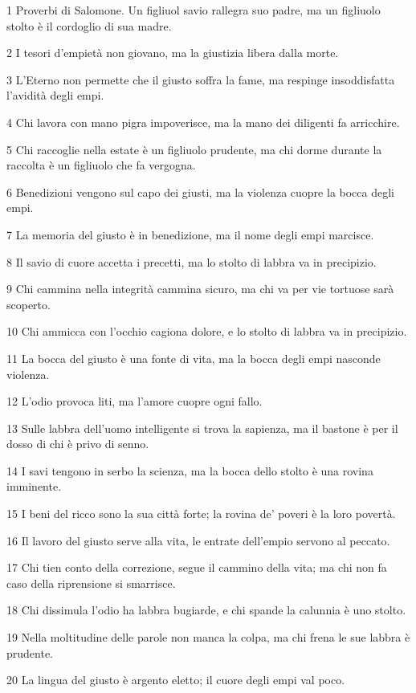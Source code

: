 \par 1 Proverbi di Salomone. Un figliuol savio rallegra suo padre, ma un figliuolo stolto è il cordoglio di sua madre.
\par 2 I tesori d'empietà non giovano, ma la giustizia libera dalla morte.
\par 3 L'Eterno non permette che il giusto soffra la fame, ma respinge insoddisfatta l'avidità degli empi.
\par 4 Chi lavora con mano pigra impoverisce, ma la mano dei diligenti fa arricchire.
\par 5 Chi raccoglie nella estate è un figliuolo prudente, ma chi dorme durante la raccolta è un figliuolo che fa vergogna.
\par 6 Benedizioni vengono sul capo dei giusti, ma la violenza cuopre la bocca degli empi.
\par 7 La memoria del giusto è in benedizione, ma il nome degli empi marcisce.
\par 8 Il savio di cuore accetta i precetti, ma lo stolto di labbra va in precipizio.
\par 9 Chi cammina nella integrità cammina sicuro, ma chi va per vie tortuose sarà scoperto.
\par 10 Chi ammicca con l'occhio cagiona dolore, e lo stolto di labbra va in precipizio.
\par 11 La bocca del giusto è una fonte di vita, ma la bocca degli empi nasconde violenza.
\par 12 L'odio provoca liti, ma l'amore cuopre ogni fallo.
\par 13 Sulle labbra dell'uomo intelligente si trova la sapienza, ma il bastone è per il dosso di chi è privo di senno.
\par 14 I savi tengono in serbo la scienza, ma la bocca dello stolto è una rovina imminente.
\par 15 I beni del ricco sono la sua città forte; la rovina de' poveri è la loro povertà.
\par 16 Il lavoro del giusto serve alla vita, le entrate dell'empio servono al peccato.
\par 17 Chi tien conto della correzione, segue il cammino della vita; ma chi non fa caso della riprensione si smarrisce.
\par 18 Chi dissimula l'odio ha labbra bugiarde, e chi spande la calunnia è uno stolto.
\par 19 Nella moltitudine delle parole non manca la colpa, ma chi frena le sue labbra è prudente.
\par 20 La lingua del giusto è argento eletto; il cuore degli empi val poco.
